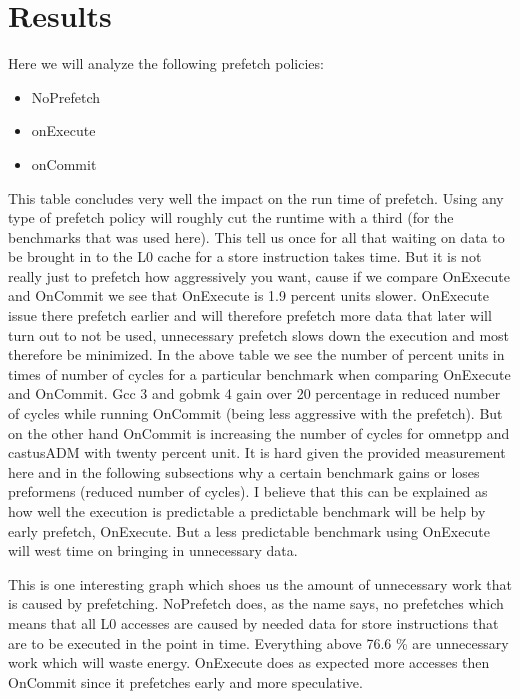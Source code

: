 \chapter{Results}
\label{chap:results}


Here we will analyze the following prefetch policies:
\begin{itemize}
	\item NoPrefetch
	\item onExecute
	\item onCommit
\end{itemize}
\resExtime
{}
This table concludes very well the impact on the run time of prefetch. Using any type of prefetch policy will roughly cut the runtime with a third (for the benchmarks that was used here). This tell us once for all that waiting on data to be brought in to the L0 cache for a store instruction takes time. But it is not really just to prefetch how aggressively you want, cause if we compare OnExecute and OnCommit we see that OnExecute is 1.9 percent units slower. OnExecute issue there prefetch earlier and will therefore prefetch more data that later will turn out to not be used, unnecessary prefetch slows down the execution and most therefore be minimized.
In the above table we see the number of percent units in times of number of cycles for a particular benchmark when comparing OnExecute and OnCommit. Gcc 3 and gobmk 4 gain over 20 percentage in reduced number of cycles while running OnCommit (being less aggressive with the prefetch). But on the other hand OnCommit is increasing the number of cycles for omnetpp and castusADM with twenty percent unit. It is hard given the provided measurement here and in the following subsections why a certain benchmark gains or loses preformens (reduced number of cycles). I believe that this can be explained as how well the execution is predictable a predictable benchmark will be help by early prefetch, OnExecute. But a less predictable benchmark using OnExecute will west time on bringing in unnecessary data.
\resAcc

This is one interesting graph which shoes us the amount of unnecessary work that is caused by prefetching. NoPrefetch does, as the name says, no prefetches which means that all L0 accesses are caused by needed data for store instructions that are to be executed in the point in time. Everything above 76.6 \% are unnecessary work which will waste energy. OnExecute does as expected more accesses then OnCommit since it prefetches early and more speculative.

